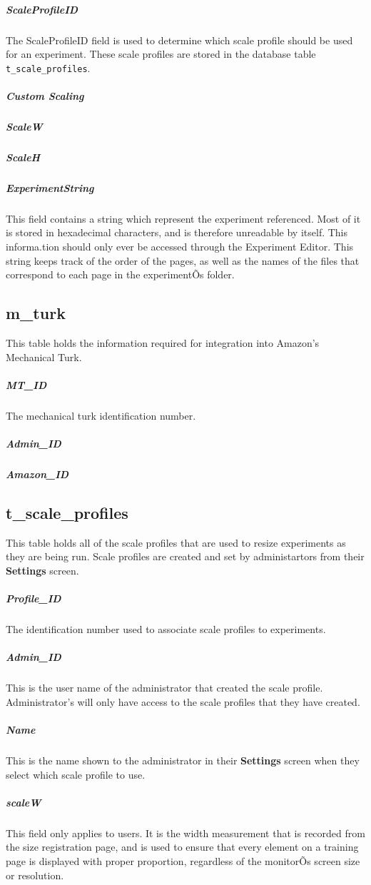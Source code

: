 \documentclass[article]{ij4uq}              %
\begin{document}
\subparagraph{ScaleProfileID}
The ScaleProfileID field is used to determine which scale profile should be used for an experiment.  These scale profiles are stored in the database table \texttt{t\_scale\_profiles}.

\subparagraph{Custom Scaling}

\subparagraph{ScaleW}

\subparagraph{ScaleH}

\subparagraph{ExperimentString}
This field contains a string which represent the experiment referenced. Most of it is stored in hexadecimal characters, and is therefore unreadable by itself. This informa.tion should only ever be accessed through the Experiment Editor. This string keeps track of the order of the pages, as well as the names of the files that correspond to each page in the experimentÕs folder. 


\subsection{m\_turk}
This table holds the information required for integration into Amazon's Mechanical Turk.

\subparagraph{MT\_ID}
The mechanical turk identification number.

\subparagraph{Admin\_ID}

\subparagraph{Amazon\_ID}


\subsection{t\_scale\_profiles}
This table holds all of the scale profiles that are used to resize experiments as they are being run.  Scale profiles are created and set by administartors from their \textbf{Settings} screen.

\subparagraph{Profile\_ID}
The identification number used to associate scale profiles to experiments.

\subparagraph{Admin\_ID}
This is the user name of the administrator that created the scale profile.  Administrator's will only have access to the scale profiles that they have created.

\subparagraph{Name}
This is the name shown to the administrator in their \textbf{Settings} screen when they select which scale profile to use.

\subparagraph{scaleW}
This field only applies to users. It is the width measurement that is recorded from the size registration page, and is used to ensure that every element on a training page is displayed with proper proportion, regardless of the monitorÕs screen size or resolution. 
\end{document}
